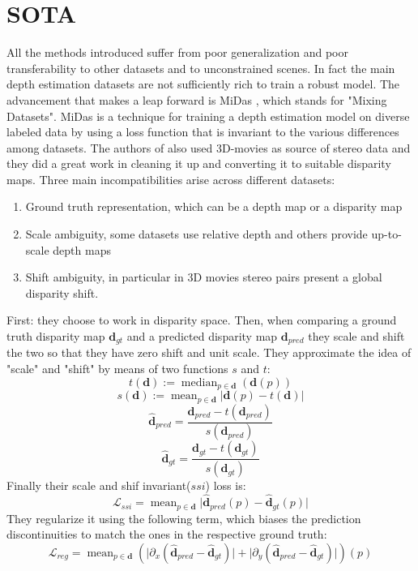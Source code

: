 \section{SOTA}
All the methods introduced suffer from poor generalization and poor transferability to other datasets and to unconstrained scenes. In fact the main depth estimation datasets are not sufficiently rich to train a robust model. The advancement that makes a leap forward is MiDas \cite{MiDas}, which stands for "Mixing Datasets". MiDas is a technique for training a depth estimation model on diverse labeled data by using a loss function that is invariant to the various differences among datasets. The authors of \cite{MiDas} also used 3D-movies as source of stereo data and they did a great work in cleaning it up and converting it to suitable disparity maps. Three main incompatibilities arise across different datasets:
\begin{enumerate}
	\item Ground truth representation, which can be a depth map or a disparity map
	\item Scale ambiguity, some datasets use relative depth and others provide up-to-scale depth maps
	\item Shift ambiguity, in particular in 3D movies stereo pairs present a global disparity shift.
\end{enumerate}
First: they choose to work in disparity space. Then, when comparing a ground truth disparity map $\mathbf{d}_{gt}$ and a predicted disparity map $\mathbf{d}_{pred}$ they scale and shift the two so that they have zero shift and unit scale. They approximate the idea of "scale" and "shift" by means of two functions $s$ and $t$:
\[
	t(\mathbf{d}) := \mathop{\text{median}}_{p \in \mathbf{d}}(\mathbf{d}(p))
\] \[
	s(\mathbf{d}) := \mathop{\text{mean}}_{p \in \mathbf{d}} \big| \mathbf{d}(p) - t(\mathbf{d}) \big|
\] \[
	\hat{\mathbf{d}}_{pred} = \frac{\mathbf{d}_{pred} - t(\mathbf{d}_{pred})}{s(\mathbf{d}_{pred})}
\] \[
	\hat{\mathbf{d}}_{gt} = \frac{\mathbf{d}_{gt} - t(\mathbf{d}_{gt})}{s(\mathbf{d}_{gt})}
\]
Finally their scale and shif invariant($ssi$) loss is:
\[
	\mathcal{L}_{ssi} = \mathop{\text{mean}}_{p \in \mathbf{d}} \big| \hat{\mathbf{d}}_{pred}(p) - \hat{\mathbf{d}}_{gt}(p)\big|
\]
They regularize it using the following term, which biases the prediction discontinuities to match the ones in the respective ground truth:
\[
	\mathcal{L}_{reg} = \mathop{\text{mean}}_{p \in \mathbf{d}}
		\left(
			\big| \partial_{x} (\hat{\mathbf{d}}_{pred} - \hat{\mathbf{d}}_{gt}) \big| +
			\big| \partial_{y} (\hat{\mathbf{d}}_{pred} - \hat{\mathbf{d}}_{gt}) \big| 
		\right)(p)
\]

